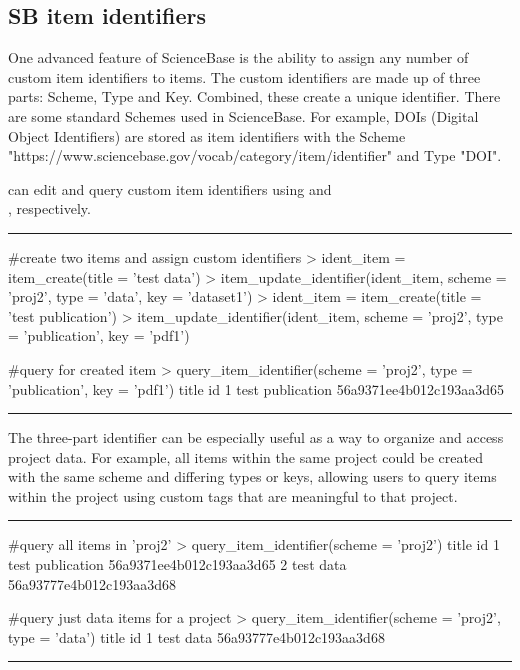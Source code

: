 \subsection{SB item identifiers}
One advanced feature of ScienceBase is the ability to assign any
number of custom item identifiers to items. The custom identifiers are made up
of three parts: Scheme, Type and Key. Combined, these create a unique identifier.
There are some standard Schemes used in ScienceBase. For example, DOIs (Digital
Object Identifiers) are stored as item identifiers with the Scheme \\
"https://www.sciencebase.gov/vocab/category/item/identifier" and Type "DOI".

 can edit and query custom item identifiers using
 and \\
,
respectively.

\noindent\rule{\textwidth}{0.4pt}
\begin{example}
#create two items and assign custom identifiers
> ident_item = item_create(title = 'test data')
> item_update_identifier(ident_item, scheme = 'proj2', type = 'data', key = 'dataset1')
> ident_item = item_create(title = 'test publication')
> item_update_identifier(ident_item, scheme = 'proj2', type = 'publication', key = 'pdf1')

#query for created item
> query_item_identifier(scheme = 'proj2', type = 'publication', key = 'pdf1')
             title                       id
1 test publication 56a9371ee4b012c193aa3d65
\end{example}
\noindent\rule{\textwidth}{0.4pt}

The three-part identifier can be especially useful as a way to
organize and access project data. For example, all items within the same project
could be created with the same scheme and differing types or keys, allowing
users to query items within the project using custom tags that are meaningful to
that project.

\noindent\rule{\textwidth}{0.4pt}
\begin{example}
#query all items in 'proj2'
> query_item_identifier(scheme = 'proj2')
             title                       id
1 test publication 56a9371ee4b012c193aa3d65
2        test data 56a93777e4b012c193aa3d68

#query just data items for a project
> query_item_identifier(scheme = 'proj2', type = 'data')
      title                       id
1 test data 56a93777e4b012c193aa3d68
\end{example}
\noindent\rule{\textwidth}{0.4pt}
